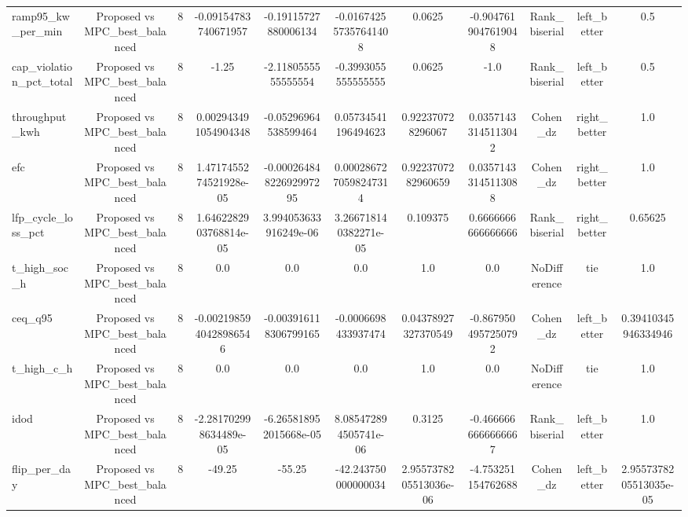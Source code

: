 \begin{table}[t]
\begin{tabular}{lcccccccccc}
ramp95\_kw\_per\_min & Proposed vs MPC\_best\_balanced & 8 & -0.09154783740671957 & -0.19115727880006134 & -0.016742557357641408 & 0.0625 & -0.9047619047619048 & Rank\_biserial & left\_better & 0.5 \\
cap\_violation\_pct\_total & Proposed vs MPC\_best\_balanced & 8 & -1.25 & -2.1180555555555554 & -0.3993055555555555 & 0.0625 & -1.0 & Rank\_biserial & left\_better & 0.5 \\
throughput\_kwh & Proposed vs MPC\_best\_balanced & 8 & 0.002943491054904348 & -0.05296964538599464 & 0.05734541196494623 & 0.922370728296067 & 0.03571433145113042 & Cohen\_dz & right\_better & 1.0 \\
efc & Proposed vs MPC\_best\_balanced & 8 & 1.4717455274521928e-05 & -0.00026484822692997295 & 0.0002867270598247314 & 0.9223707282960659 & 0.03571433145113088 & Cohen\_dz & right\_better & 1.0 \\
lfp\_cycle\_loss\_pct & Proposed vs MPC\_best\_balanced & 8 & 1.6462282903768814e-05 & 3.994053633916249e-06 & 3.266718140382271e-05 & 0.109375 & 0.6666666666666666 & Rank\_biserial & right\_better & 0.65625 \\
t\_high\_soc\_h & Proposed vs MPC\_best\_balanced & 8 & 0.0 & 0.0 & 0.0 & 1.0 & 0.0 & NoDifference & tie & 1.0 \\
ceq\_q95 & Proposed vs MPC\_best\_balanced & 8 & -0.0021985940428986546 & -0.003916118306799165 & -0.0006698433937474 & 0.04378927327370549 & -0.8679504957250792 & Cohen\_dz & left\_better & 0.39410345946334946 \\
t\_high\_c\_h & Proposed vs MPC\_best\_balanced & 8 & 0.0 & 0.0 & 0.0 & 1.0 & 0.0 & NoDifference & tie & 1.0 \\
idod & Proposed vs MPC\_best\_balanced & 8 & -2.281702998634489e-05 & -6.265818952015668e-05 & 8.085472894505741e-06 & 0.3125 & -0.4666666666666667 & Rank\_biserial & left\_better & 1.0 \\
flip\_per\_day & Proposed vs MPC\_best\_balanced & 8 & -49.25 & -55.25 & -42.243750000000034 & 2.9557378205513036e-06 & -4.753251154762688 & Cohen\_dz & left\_better & 2.9557378205513035e-05 \\
\bottomrule
\end{tabular}
\end{table}
